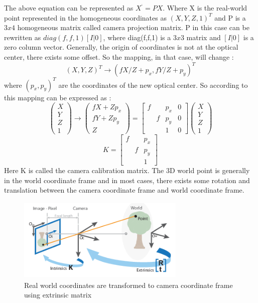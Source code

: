    
The above equation can be represented as  $X^{‘} = PX $. Where X is the real-world point represented in the homogeneous coordinates as $(X, Y, Z, 1)^{T}$ and P is a $3x4$ homogeneous matrix called camera projection matrix. P in this case can be rewritten as $diag(f,f,1) [I|0]$, where diag(f,f,1) is a $3x3$ matrix and $[I|0]$ is a zero column vector. 
Generally, the origin of coordinates is not at the optical center, there exists some offset. So the mapping, in that case, will change \cite{10.5555/861369}: 
\begin{equation}
(X,Y,Z)^{T} \rightarrow (fX/Z + p_{x}, fY/Z + p_{y})^{T}
\end{equation}
 where $(p_{x}, p_{y})^{T}$ are the coordinates of the new optical center. So according to this mapping can be expressed as \cite{10.5555/861369}:
   \begin{equation}
\left(\begin{array}{c}X \\ Y \\ Z \\ 1 \end{array}\right) \rightarrow \left(\begin{array}{c} fX + Zp_{x} \\ fY + Zp_{y} \\ Z \end{array}\right) = \begin{bmatrix}f & &p_{x} & 0 \\  &f &p_{y} & 0  \\   & &1 & 0   \end{bmatrix}\left(\begin{array}{c}X\\ Y  \\Z \\ 1 \end{array}\right)
\end{equation}
\begin{equation}
K =  \begin{bmatrix}f & &p_{x} \\  &f &p_{y}  \\   & &1    \end{bmatrix}
\end{equation}
 Here K is called the camera calibration matrix. The 3D world point is generally in the world coordinate frame and in most cases, there exists some rotation and translation between the camera coordinate frame and world coordinate frame.
 
    \begin{figure}[h]
    \centering
    \includegraphics[width=8cm, height =4cm]{images/camera_geo.png}
    \caption{ Real world coordinates \cite{10.5555/861369} are transformed to camera coordinate frame using extrinsic matrix }
    \end{figure}
    
